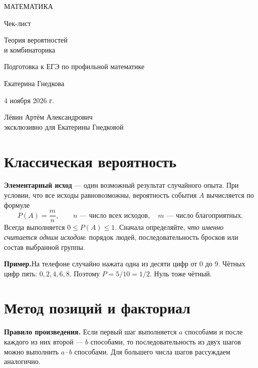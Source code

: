 \documentclass[a4paper,12pt]{article}
\newcommand{\key}[1]{\textcolor{darkaccent}{\textbf{#1}}}
\newcommand{\sample}[1]{\par\medskip\textcolor{darkaccent}{\textbf{Пример.}}\quad #1\par}
\newcommand{\sect}[1]{\section{#1}\vspace{-3pt}}
\begin{document}
\thispagestyle{empty}
\begin{center}
\vspace*{30mm}
{\small\color{darkaccent}\MakeUppercase{Математика}}\par
\vspace{17mm}
{\LARGE Чек-лист}\par
\vspace{10mm}
{\Large\color{accent}Теория вероятностей\\[2mm]и комбинаторика}\par
\vspace{16mm}
{\normalsize Подготовка к ЕГЭ по профильной математике}\par
\vspace{33mm}
{\normalsize Екатерина Гнедкова}\par
\vspace{8mm}
{\normalsize 4 ноября 2026 г.}\par
\vspace{20mm}
{\small Лёвин Артём Александрович\\ эксклюзивно для Екатерины Гнедковой}\par
\vfill
{}
\vspace*{13mm}
\end{center}
\clearpage

\sect{Классическая вероятность}
\key{Элементарный исход} --- один возможный результат случайного опыта. При условии, что все исходы равновозможны, вероятность события $A$ вычисляется по формуле
\[
\boxed{P(A)=\frac{m}{n}},
\qquad n\text{ --- число всех исходов},\quad m\text{ --- число благоприятных.}
\]
Всегда выполняется $0\le P(A)\le1$. Сначала определяйте, \emph{что именно считается одним исходом}: порядок людей, последовательность бросков или состав выбранной группы.

\sample{На телефоне случайно нажата одна из десяти цифр от $0$ до $9$. Чётных цифр пять: $0,2,4,6,8$. Поэтому $P=5/10=1/2$. Нуль тоже чётный.}

\sect{Метод позиций и факториал}
\key{Правило произведения.} Если первый шаг выполняется $a$ способами и после каждого из них второй --- $b$ способами, то последовательность из двух шагов можно выполнить $a\cdot b$ способами. Для большего числа шагов рассуждаем аналогично.
\end{document}

